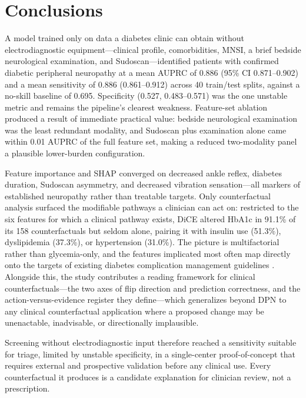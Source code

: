 \documentclass[pdflatex,sn-mathphys-num]{sn-jnl}%
\theoremstyle{thmstyleone}%
\theoremstyle{thmstyletwo}%
\theoremstyle{thmstylethree}%
\begin{document}
\section{Conclusions}\label{conclusion}

A model trained only on data a diabetes clinic can obtain without electrodiagnostic
equipment---clinical profile, comorbidities, MNSI, a brief bedside neurological examination, and
Sudoscan---identified patients with confirmed diabetic peripheral neuropathy at a mean AUPRC of 0.886
(95\% CI 0.871--0.902) and a mean sensitivity of 0.886 (0.861--0.912) across 40 train/test splits,
against a no-skill baseline of 0.695. Specificity (0.527, 0.483--0.571) was the one unstable metric
and remains the pipeline's clearest weakness. Feature-set ablation produced a result of immediate
practical value: bedside neurological examination was the least redundant modality, and Sudoscan plus
examination alone came within 0.01 AUPRC of the full feature set, making a reduced two-modality panel
a plausible lower-burden configuration.

Feature importance and SHAP converged on decreased ankle reflex, diabetes duration, Sudoscan
asymmetry, and decreased vibration sensation---all markers of established neuropathy rather than
treatable targets. Only counterfactual analysis surfaced the modifiable pathways a clinician can act
on: restricted to the six features for which a clinical pathway exists, DiCE altered HbA1c in 91.1\%
of its 158 counterfactuals but seldom alone, pairing it with insulin use (51.3\%), dyslipidemia
(37.3\%), or hypertension (31.0\%). The picture is multifactorial rather than glycemia-only, and the
features implicated most often map directly onto the targets of existing diabetes complication
management guidelines \cite{ada2024}. Alongside this, the study contributes a reading framework for clinical
counterfactuals---the two axes of flip direction and prediction correctness, and the
action-versus-evidence register they define---which generalizes beyond DPN to any clinical
counterfactual application where a proposed change may be unenactable, inadvisable, or directionally
implausible.

Screening without electrodiagnostic input therefore reached a sensitivity suitable for triage, limited
by unstable specificity, in a single-center proof-of-concept that requires external and prospective
validation before any clinical use. Every counterfactual it produces is a candidate explanation for
clinician review, not a prescription.
\end{document}

